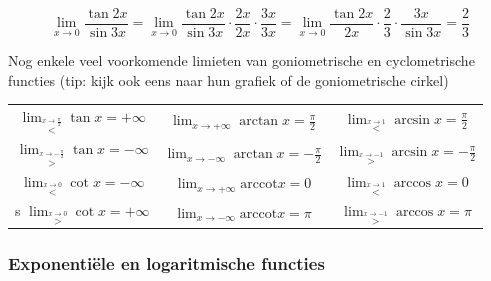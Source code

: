 \begin{voorbeeld}

\begin{equation*}
\lim_{x\rightarrow0}\frac{\tan2x}{\sin3x}=\lim_{x\rightarrow0}\frac{\tan2x}{\sin3x}\cdot \frac{2x}{2x}\cdot \frac{3x}{3x}=\lim_{x\rightarrow0}\frac{\tan2x}{2x}\cdot \frac{2}{3}\cdot \frac{3x}{\sin3x}=\frac{2}{3}
\end{equation*}

\end{voorbeeld}



Nog enkele veel voorkomende limieten van goniometrische
en cyclometrische functies (tip: kijk ook eens naar hun grafiek of
de goniometrische cirkel)

\begin{table}[ht]
	\centering
	\begin{tabular}{c|c|c}
		$\lim_{\overset{x\rightarrow\frac{\pi}{2}}{<}}\tan x=+\infty$ & $\lim_{x\rightarrow+\infty}\arctan x=\frac{\pi}{2}$ & $\lim_{\overset{x\rightarrow1}{<}}\arcsin x=\frac{\pi}{2}$\\
		$\lim_{\overset{x\rightarrow-\frac{\pi}{2}}{>}}\tan x=-\infty$ & $\lim_{x\rightarrow-\infty}\arctan x=-\frac{\pi}{2}$ & $\lim_{\overset{x\rightarrow-1}{>}}\arcsin x=-\frac{\pi}{2}$\\
		$\lim_{\overset{x\rightarrow0}{<}}\cot x=-\infty$ & $\lim_{x\rightarrow+\infty}\mathrm{arccot}x=0$ & $\lim_{\overset{x\rightarrow1}{<}}\arccos x=0$\\s
		$\lim_{\overset{x\rightarrow0}{>}}\cot x=+\infty$  & $\lim_{x\rightarrow-\infty}\mathrm{arccot}x=\pi$ & $\lim_{\overset{x\rightarrow-1}{>}}\arccos x=\pi$\\
	\end{tabular}
\end{table}


\begin{figure}[H]
	\centering
	
\end{figure}

\begin{figure}[H]
\centering

\end{figure}



\subsubsection{Exponenti\"ele en logaritmische functies}

